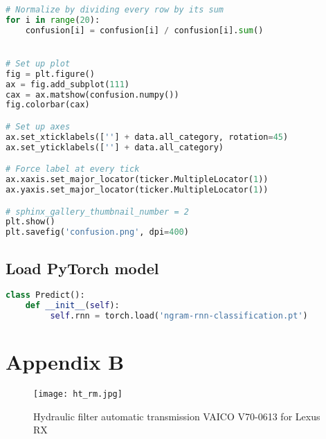 \begin{appendices}
\begin{lstlisting}[language=Python,caption={Confusion matrix},label={code:confusion matrix}]
# Normalize by dividing every row by its sum
for i in range(20):
    confusion[i] = confusion[i] / confusion[i].sum()


# Set up plot
fig = plt.figure()
ax = fig.add_subplot(111)
cax = ax.matshow(confusion.numpy())
fig.colorbar(cax)

# Set up axes
ax.set_xticklabels([''] + data.all_category, rotation=45)
ax.set_yticklabels([''] + data.all_category)

# Force label at every tick
ax.xaxis.set_major_locator(ticker.MultipleLocator(1))
ax.yaxis.set_major_locator(ticker.MultipleLocator(1))

# sphinx_gallery_thumbnail_number = 2
plt.show()
plt.savefig('confusion.png', dpi=400)

\end{lstlisting}

\subsection*{Load PyTorch model}
\begin{lstlisting}[language=Python,caption={Load PyTorch model},label={code:Loadpt}]
class Predict():
    def __init__(self):
         self.rnn = torch.load('ngram-rnn-classification.pt')
        \end{lstlisting}

\section{Appendix B}
\begin{figure}
    \centering    
    \texttt{[image: ht\_rm.jpg]}
    \caption{Hydraulic filter automatic transmission VAICO V70-0613 for Lexus RX \parencite{RM}}
    \label{fig:sparepart}
\end{figure}

\end{appendices}
